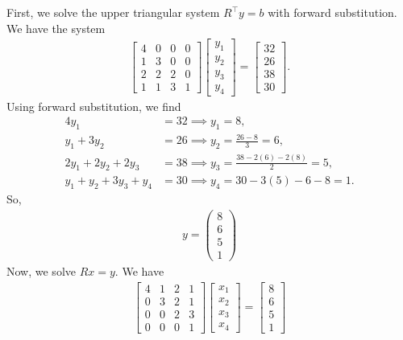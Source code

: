 \documentclass{report}
\begin{document}
    First, we solve the upper triangular system $R^{\top}y = b $ with forward substitution. We have the system 
    \begin{align*}
        \begin{bmatrix}
            4 & 0 & 0 & 0 \\
            1 & 3 & 0 & 0\\
            2 & 2 & 2 & 0\\
            1 & 1 & 3 & 1
        \end{bmatrix}
        \begin{bmatrix}
            y_{1} \\ y_{2} \\ y_{3} \\ y_{4}
        \end{bmatrix}
        =
        \begin{bmatrix}
            32 \\ 26 \\ 38 \\ 30
        \end{bmatrix}
    .\end{align*}
    Using forward substitution, we find
    \begin{align*}
        4y_{1} &= 32 \implies y_{1} = 8, \\
        y_{1} + 3y_{2} &= 26 \implies y_{2} = \frac{26-8}{3} = 6, \\
        2y_{1} + 2y_{2} + 2y_{3} &= 38 \implies y_{3} = \frac{38-2(6)-2(8)}{2} = 5, \\
        y_{1} + y_{2} + 3y_{3} + y_{4} &= 30\implies y_{4} = 30-3(5)-6-8 = 1
    .\end{align*}
    So, 
    \begin{align*}
        y = \begin{pmatrix} 8 \\ 6 \\ 5 \\ 1 \end{pmatrix}
    \end{align*}
    Now, we solve $Rx = y$. We have
    \begin{align*}
         \begin{bmatrix}
            4 & 1 & 2 & 1 \\
            0 & 3 & 2 & 1 \\
            0 & 0 & 2 &3 \\
            0 & 0 & 0 & 1
        \end{bmatrix}
        \begin{bmatrix}
           x_{1} \\ x_{2} \\ x_{3} \\ x_{4} 
        \end{bmatrix}
        =
        \begin{bmatrix}
            8 \\ 6\\ 5\\1
        \end{bmatrix}
    \end{align*}
\end{document}
